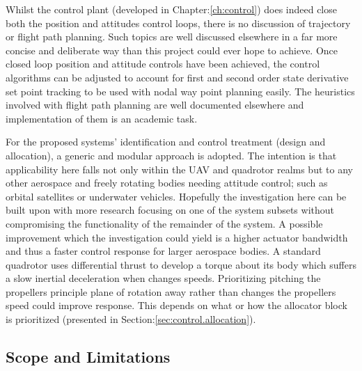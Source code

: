 \par
Whilst the control plant (developed in Chapter:\ref{ch:control}) does indeed close both the position  and attitudes control loops, there is no discussion of trajectory or flight path planning. Such topics are well discussed elsewhere in a far more concise and deliberate way than this project could ever hope to achieve. Once closed loop position and attitude controls have been achieved, the control algorithms can be adjusted to account for first and second order state derivative set point tracking to be used with nodal way point planning easily. The heuristics involved with flight path planning are well documented elsewhere and implementation of them is an academic task.
\par
For the proposed systems' identification and control treatment (design and allocation), a generic and modular approach is adopted. The intention is that applicability here falls not only within the UAV and quadrotor realms but to any other aerospace and freely rotating bodies needing attitude control; such as orbital satellites or underwater vehicles. Hopefully the investigation here can be built upon with more research focusing on one of the system subsets without compromising the functionality of the remainder of the system. A possible improvement which the investigation could yield is a higher actuator bandwidth and thus a faster control response for larger aerospace bodies. A standard quadrotor uses differential thrust to develop a torque about its body which suffers a slow inertial deceleration when changes speeds. Prioritizing pitching the propellers principle plane of rotation away rather than changes the propellers speed could improve response. This depends on what or how the allocator block is prioritized (presented in Section:\ref{sec:control.allocation}).
\subsection{Scope and Limitations}
\label{subsec:intro.foreword.scopeandlim}
